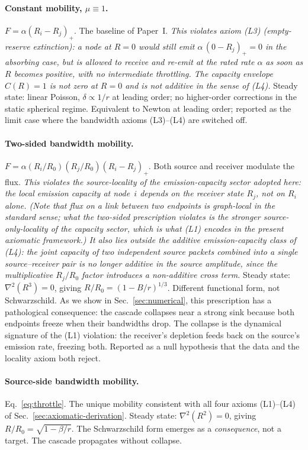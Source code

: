 \documentclass[11pt,a4paper]{article}
\begin{document}
\paragraph{Constant mobility, $\mu \equiv 1$.}
$F = \alpha (R_i - R_j)_+$. The baseline of Paper~I. \emph{This
violates axiom (L3) (empty-reserve extinction): a node at
$R=0$ would still emit $\alpha\,(0 - R_j)_+ = 0$ in the
absorbing case, but is allowed to receive and re-emit at the
rated rate $\alpha$ as soon as $R$ becomes positive, with no
intermediate throttling. The capacity envelope $C(R) = 1$ is
not zero at $R=0$ and is not additive in the sense of (L4).}
Steady state: linear Poisson, $\delta \propto 1/r$ at leading
order; no higher-order corrections in the static spherical
regime. Equivalent to Newton at leading order; reported as the
limit case where the bandwidth axioms (L3)--(L4) are switched
off.

\paragraph{Two-sided bandwidth mobility.}
$F = \alpha (R_i/R_0)(R_j/R_0)(R_i - R_j)_+$. Both source and
receiver modulate the flux. \emph{This violates the
\emph{source-locality} of the emission-capacity sector adopted
here: the local emission capacity at node~$i$ depends on the
receiver state $R_j$, not on $R_i$ alone. (Note that flux on a
link between two endpoints is graph-local in the standard sense;
what the two-sided prescription violates is the stronger
source-only-locality of the capacity sector, which is what (L1)
encodes in the present axiomatic framework.) It also lies outside
the additive emission-capacity class of (L4): the joint capacity
of two independent source packets combined into a single
source--receiver pair is no longer additive in the source
amplitude, since the multiplicative $R_j/R_0$ factor introduces a
non-additive cross term.}
Steady state: $\nabla^2(R^3) = 0$, giving
$R/R_0 = (1 - B/r)^{1/3}$. Different functional form, not
Schwarzschild. As we show in Sec.~\ref{sec:numerical}, this
prescription has a pathological consequence: the cascade
collapses near a strong sink because both endpoints freeze when
their bandwidths drop. The collapse is the dynamical signature
of the (L1) violation: the receiver's depletion feeds back on
the source's emission rate, freezing both. Reported as a null
hypothesis that the data and the locality axiom both reject.

\paragraph{Source-side bandwidth mobility.}
Eq.~\eqref{eq:throttle}. The unique mobility consistent with
all four axioms (L1)--(L4) of
Sec.~\ref{sec:axiomatic-derivation}. Steady state:
$\nabla^2(R^2) = 0$, giving $R/R_0 = \sqrt{1 - \beta/r}$. The
Schwarzschild form emerges as a \emph{consequence}, not a
target. The cascade propagates without collapse.
\end{document}
